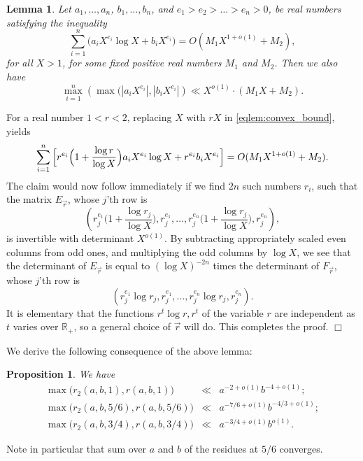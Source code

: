 \documentclass{article}
\def\R{{\mathbb R}}
\newtheorem{lemma}[theorem]{Lemma}
\newtheorem{proposition}[theorem]{Proposition}
\newenvironment{proof}{\noindent {\bf Proof:}}{$\Box$ \vspace{2 ex}}
\begin{document}
\begin{lemma}\label{lem:convex_bound}
Let $a_1,\dots,a_n$, $b_1,\dots,b_n$, and $e_1>e_2>\dots>e_n>0$, be real numbers satisfying the inequality 
\begin{equation}\label{eqlem:convex_bound}
\sum_{i=1}^n \bigl(a_iX^{e_i}\log X + b_iX^{e_i}\bigr) = O(M_1X^{1+o(1)}+M_2),
\end{equation}
for all $X>1$, for some fixed positive real numbers $M_1$ and $M_2$.
Then we also have 
$$\max_{i=1}^n\left(\max(|a_iX^{e_i}|,|b_iX^{e_i}|\right) \ll X^{o(1)}\cdot (M_1X+M_2).$$
\end{lemma}

\begin{proof}
For a real number $1<r<2$, replacing $X$ with $rX$ in \eqref{eqlem:convex_bound}, yields 
$$\sum_{i=1}^n \Big[ r^{e_i}\Bigl(1+\frac{\log r}{\log X}\Bigr) a_iX^{e_i}\log X + r^{e_i}b_iX^{e_i} \Big]= O(M_1X^{1+o(1)}+M_2).$$ 
The claim would now follow immediately if we find $2n$ such numbers $r_i$, such that the matrix $E_{\vec{r}}$, whose $j$'th row is 
$$\left(r_j^{e_1}\Big(1+\frac{\log r_j}{\log X}\Big),r_j^{e_1},\dots,r_j^{e_n}\Big(1+\frac{\log r_j}{\log X}\Big),r_j^{e_n}\right),$$ is invertible with determinant $X^{o(1)}$. By subtracting appropriately scaled even columns from odd ones, and multiplying the odd columns by $\log X$, we see that the determinant of $E_{\vec{r}}$ is equal to $(\log X)^{-2n}$ times the determinant of $F_{\vec{r}}$, whose $j$'th row is 
$$\left(r_j^{e_1}\log r_j,r_j^{e_1},\dots,r_j^{e_n}\log r_j,r_j^{e_n}\right).$$
It is elementary that the functions  $r^t\log r,r^t$ of the variable $r$ are independent as $t$ varies over $\R_+$, so a general choice of $\vec{r}$ will do. This completes the proof.
\end{proof}

We derive the following consequence of the above lemma:
\begin{proposition}\label{prop:residue_bounds}
We have
\begin{equation*}
\begin{array}{rcl}
\max\bigl(r_2(a,b,1),r(a,b,1))&\ll& a^{-2+o(1)}b^{-4+o(1)};
\\[.12in]
\max\bigl(r_2(a,b,5/6),r(a,b,5/6))&\ll& a^{-7/6+o(1)}b^{-4/3+o(1)};
\\[.12in]
\max\bigl(r_2(a,b,3/4),r(a,b,3/4))&\ll& a^{-3/4+o(1)}b^{o(1)}.
\end{array}
\end{equation*}
\end{proposition}
Note in particular that sum over $a$ and $b$ of the residues at $5/6$ converges.
\end{document}
